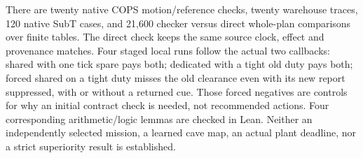 \documentclass[11pt]{article}
\begin{document}
There are twenty native COPS motion/reference checks, twenty
warehouse traces, 120 native SubT cases, and 21,600 checker versus
direct whole-plan comparisons over finite tables. The direct
check keeps the same source clock, effect and provenance matches.
Four staged local runs follow the actual two callbacks: shared
with one tick spare pays both; dedicated with a tight old duty
pays both; forced shared on a tight duty misses the old
clearance even with its new report suppressed, with or without
a returned cue. Those forced negatives are controls for why an
initial contract check is needed, not recommended actions.
Four corresponding arithmetic/logic lemmas are checked in Lean.
Neither an independently selected mission, a learned cave map,
an actual plant deadline, nor a strict superiority result is
established.
\end{document}

